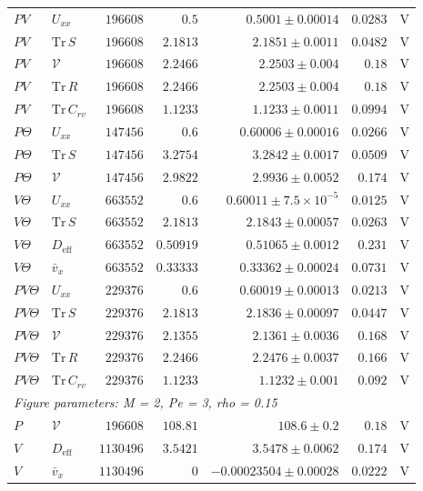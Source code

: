 \begin{longtable}{llrrrrc}
$PV$ & $U_{xx}$ & $196608$ & $0.5$ & $0.5001 \pm 0.00014$ & $0.0283$ & V \\
$PV$ & $\mathrm{Tr}\,S$ & $196608$ & $2.1813$ & $2.1851 \pm 0.0011$ & $0.0482$ & V \\
$PV$ & $\mathcal V$ & $196608$ & $2.2466$ & $2.2503 \pm 0.004$ & $0.18$ & V \\
$PV$ & $\mathrm{Tr}\,R$ & $196608$ & $2.2466$ & $2.2503 \pm 0.004$ & $0.18$ & V \\
$PV$ & $\mathrm{Tr}\,C_{rv}$ & $196608$ & $1.1233$ & $1.1233 \pm 0.0011$ & $0.0994$ & V \\
$P\Theta$ & $U_{xx}$ & $147456$ & $0.6$ & $0.60006 \pm 0.00016$ & $0.0266$ & V \\
$P\Theta$ & $\mathrm{Tr}\,S$ & $147456$ & $3.2754$ & $3.2842 \pm 0.0017$ & $0.0509$ & V \\
$P\Theta$ & $\mathcal V$ & $147456$ & $2.9822$ & $2.9936 \pm 0.0052$ & $0.174$ & V \\
$V\Theta$ & $U_{xx}$ & $663552$ & $0.6$ & $0.60011 \pm 7.5\times10^{-5}$ & $0.0125$ & V \\
$V\Theta$ & $\mathrm{Tr}\,S$ & $663552$ & $2.1813$ & $2.1843 \pm 0.00057$ & $0.0263$ & V \\
$V\Theta$ & $D_{\mathrm{eff}}$ & $663552$ & $0.50919$ & $0.51065 \pm 0.0012$ & $0.231$ & V \\
$V\Theta$ & $\bar v_x$ & $663552$ & $0.33333$ & $0.33362 \pm 0.00024$ & $0.0731$ & V \\
$PV\Theta$ & $U_{xx}$ & $229376$ & $0.6$ & $0.60019 \pm 0.00013$ & $0.0213$ & V \\
$PV\Theta$ & $\mathrm{Tr}\,S$ & $229376$ & $2.1813$ & $2.1836 \pm 0.00097$ & $0.0447$ & V \\
$PV\Theta$ & $\mathcal V$ & $229376$ & $2.1355$ & $2.1361 \pm 0.0036$ & $0.168$ & V \\
$PV\Theta$ & $\mathrm{Tr}\,R$ & $229376$ & $2.2466$ & $2.2476 \pm 0.0037$ & $0.166$ & V \\
$PV\Theta$ & $\mathrm{Tr}\,C_{rv}$ & $229376$ & $1.1233$ & $1.1232 \pm 0.001$ & $0.092$ & V \\
\multicolumn{7}{l}{\textit{Figure parameters: M = 2, Pe = 3, rho = 0.15}} \\
$P$ & $\mathcal V$ & $196608$ & $108.81$ & $108.6 \pm 0.2$ & $0.18$ & V \\
$V$ & $D_{\mathrm{eff}}$ & $1130496$ & $3.5421$ & $3.5478 \pm 0.0062$ & $0.174$ & V \\
$V$ & $\bar v_x$ & $1130496$ & $0$ & $-0.00023504 \pm 0.00028$ & $0.0222$ & V \\

\end{longtable}

